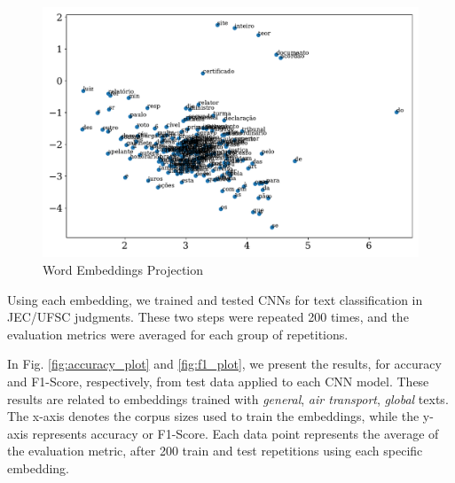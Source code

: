 \begin{figure}[htb]
    \centering
    \caption{Word Embeddings Projection}
    \label{fig:projection}
    \includegraphics[width=\textwidth]{images/chapters/projection.pdf}
    
\end{figure}

Using each embedding, we trained and tested CNNs for text classification in JEC/UFSC judgments. These two steps were repeated 200 times, and the evaluation metrics were averaged for each group of repetitions.

In Fig. \ref{fig:accuracy_plot} and \ref{fig:f1_plot}, we present the results, for accuracy and F1-Score, respectively, from test data applied to each CNN model. These results are related to embeddings trained with \textit{general}, \textit{air transport}, \textit{global} texts. 
The x-axis denotes the corpus sizes used to train the embeddings, while the y-axis represents accuracy or F1-Score. Each data point represents the average of the evaluation metric, after 200 train and test repetitions using each specific embedding. %



